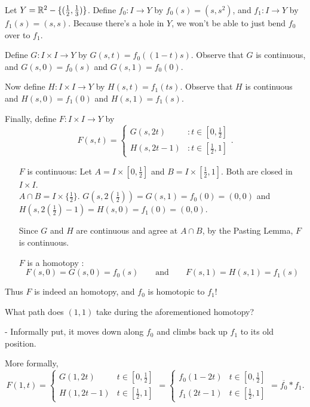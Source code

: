 \begin{example}
	Let $Y = \mathbb R^2 - \{(\frac{1}{2}, \frac{1}{3})\}$. Define $f_0: I \rightarrow Y$ by $f_0(s) = (s,s^2)$, and $f_1: I \rightarrow Y$ by $f_1(s) = (s,s).$ Because there's a hole in $Y$, we won't be able to just bend $f_0$ over to $f_1$.
	
	Define $G: I \times I \rightarrow Y$ by $G(s,t) = f_0((1-t)s)$. Observe that $G$ is continuous, and $G(s,0) = f_0(s)$ and $G(s,1) = f_0(0)$.
	
	Now define $H: I \times I \rightarrow Y$ by $H(s,t) = f_1(ts)$. Observe that $H$ is continuous and $H(s,0) = f_1(0)$ and $H(s,1) = f_1(s)$.
	
	Finally, define $F: I \times I \rightarrow Y$ by 
	\begin{displaymath}
		F(s, t) = \left\{ 
		\begin{array}{lr}
			G(s, 2t) & : t \in [0, \frac{1}{2}]\\
			H(s, 2t-1) & : t \in [\frac{1}{2}, 1] 
		\end{array}
		\right. . 
	\end{displaymath}
	\begin{itemize}
		\item[ $F$ is continuous: ] Let $A = I \times [0, \frac{1}{2}]$ and $B = I \times [\frac{1}{2}, 1]$. Both are closed in $I\times I$.\\
		$A \cap B = I \times \{\frac{1}{2}\}$. $G(s, 2(\frac{1}{2})) = G(s, 1) = f_0(0) = (0,0)$ and $H(s, 2(\frac{1}{2})-1) = H(s, 0) = f_1(0) = (0,0)$.
		
		Since $G$ and $H$ are continuous and agree at $A\cap B$, by the Pasting Lemma, $F$ is continuous.
		
		\item[$F$ is a homotopy : ]
		\[F(s, 0) = G(s, 0) = f_0(s) \qquad\text{and}\qquad F(s, 1) = H(s, 1) = f_1(s) \]
	\end{itemize}
	Thus $F$ is indeed an homotopy, and $f_0$ is homotopic to $f_1$! 
\end{example}

What path does $(1, 1)$ take during the aforementioned homotopy?

- Informally put, it moves down along $f_0$ and climbs back up $f_1$ to its old position.

More formally, 
\begin{displaymath}
	F(1, t) = 
	\begin{cases}
		G(1, 2t) & t \in [0, \frac{1}{2}]\\
		H(1, 2t-1) & t \in [\frac{1}{2}, 1] 
	\end{cases}
	= 
	\begin{cases}
		f_0(1-2t) & t \in [0, \frac{1}{2}]\\
		f_1(2t-1) & t \in [\frac{1}{2}, 1] 
	\end{cases}
	=\overline{ f_0} \ast f_1. 
\end{displaymath}

